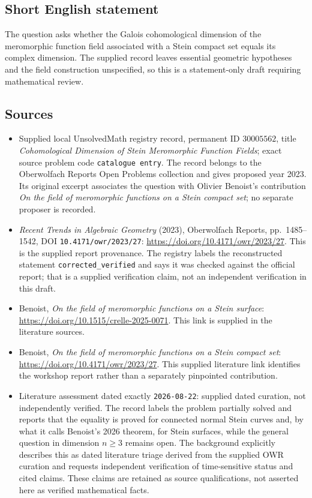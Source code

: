 \documentclass[11pt]{article}
\begin{document}
\subsection{Short English statement}
The question asks whether the Galois cohomological dimension of the meromorphic function field associated with a Stein compact set equals its complex dimension. The supplied record leaves essential geometric hypotheses and the field construction unspecified, so this is a statement-only draft requiring mathematical review.
\subsection{Sources}
\begin{itemize}
\item Supplied local UnsolvedMath registry record, permanent ID \(30005562\), title \emph{Cohomological Dimension of Stein Meromorphic Function Fields}; exact source problem code \texttt{catalogue entry}. The record belongs to the Oberwolfach Reports Open Problems collection and gives proposed year 2023. Its original excerpt associates the question with Olivier Benoist's contribution \emph{On the field of meromorphic functions on a Stein compact set}; no separate proposer is recorded.
\item \emph{Recent Trends in Algebraic Geometry} (2023), Oberwolfach Reports, pp.~1485--1542, DOI \texttt{10.4171/owr/2023/27}: \url{https://doi.org/10.4171/owr/2023/27}. This is the supplied report provenance. The registry labels the reconstructed statement \texttt{corrected\_verified} and says it was checked against the official report; that is a supplied verification claim, not an independent verification in this draft.
\item Benoist, \emph{On the field of meromorphic functions on a Stein surface}: \url{https://doi.org/10.1515/crelle-2025-0071}. This link is supplied in the literature sources.
\item Benoist, \emph{On the field of meromorphic functions on a Stein compact set}: \url{https://doi.org/10.4171/owr/2023/27}. This supplied literature link identifies the workshop report rather than a separately pinpointed contribution.
\item Literature assessment dated exactly \texttt{2026-08-22}: supplied dated curation, not independently verified. The record labels the problem partially solved and reports that the equality is proved for connected normal Stein curves and, by what it calls Benoist's 2026 theorem, for Stein surfaces, while the general question in dimension \(n\geq3\) remains open. The background explicitly describes this as dated literature triage derived from the supplied OWR curation and requests independent verification of time-sensitive status and cited claims. These claims are retained as source qualifications, not asserted here as verified mathematical facts.
\end{itemize}
\end{document}
